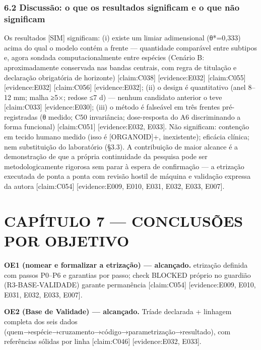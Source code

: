 \documentclass[
  12pt,
]{report}
\begin{document}
\hypertarget{discussuxe3o-o-que-os-resultados-significam-e-o-que-nuxe3o-significam}{%
\subsection{6.2 Discussão: o que os resultados significam e o que não
significam}\label{discussuxe3o-o-que-os-resultados-significam-e-o-que-nuxe3o-significam}}

Os resultados {[}SIM{]} significam: (i) existe um limiar adimensional
(θ*=0,333) acima do qual o modelo contém a frente --- quantidade
comparável entre subtipos e, agora sondada computacionalmente entre
espécies (Cenário B: aproximadamente conservada nas bandas centrais, com
regra de titulação e declaração obrigatória de horizonte)
{[}claim:C038{]} {[}evidence:E032{]} {[}claim:C055{]}
{[}evidence:E032{]} {[}claim:C056{]} {[}evidence:E032{]}; (ii) o design
é quantitativo (anel 8--12 mm; malha ≥5×; redose ≤7 d) --- nenhum
candidato anterior o teve {[}claim:C033{]} {[}evidence:E030{]}; (iii) o
método é falseável em três frentes pré-registradas (θ medido; C50
invariância; dose-resposta do A6 discriminando a forma funcional)
{[}claim:C051{]} {[}evidence:E032, E033{]}. Não significam: contenção em
tecido humano medido (isso é {[}ORGANOID{]}+, inexistente); eficácia
clínica; nem substituição do laboratório (§3.3). A contribuição de maior
alcance é a demonstração de que a própria continuidade da pesquisa pode
ser metodologicamente rigorosa sem parar à espera de confirmação --- a
etrização executada de ponta a ponta com revisão hostil de máquina e
validação expressa da autora {[}claim:C054{]} {[}evidence:E009, E010,
E031, E032, E033, E007{]}.

\hypertarget{capuxedtulo-7-conclusuxf5es-por-objetivo}{%
\chapter{CAPÍTULO 7 --- CONCLUSÕES POR
OBJETIVO}\label{capuxedtulo-7-conclusuxf5es-por-objetivo}}

\textbf{OE1 (nomear e formalizar a etrização) --- alcançado.} etrização
definida com passos P0--P6 e garantias por passo; check BLOCKED próprio
no guardião (R3-BASE-VALIDADE) garante permanência {[}claim:C054{]}
{[}evidence:E009, E010, E031, E032, E033, E007{]}.

\textbf{OE2 (Base de Validade) --- alcançado.} Tríade declarada +
linhagem completa dos seis dados
(quem→espécie→cruzamento→código→parametrização→resultado), com
referências sólidas por linha {[}claim:C046{]} {[}evidence:E032,
E033{]}.
\end{document}
